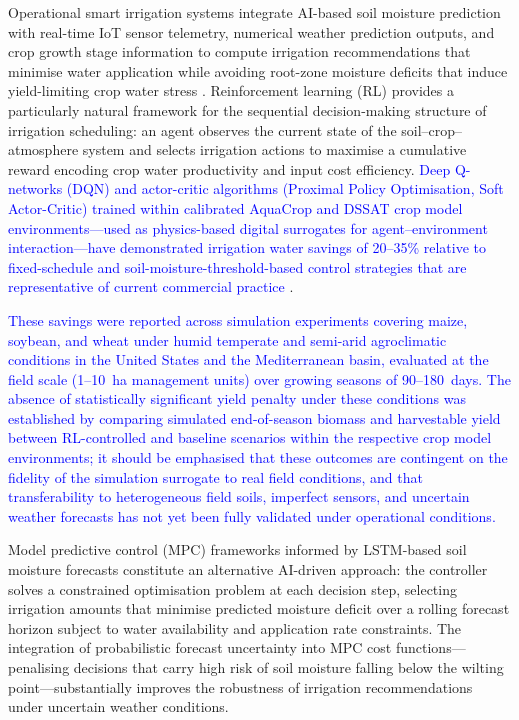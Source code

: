 \documentclass[land,article,submit,pdftex,moreauthors]{Definitions/mdpi}
\numberwithin{equation}{section}
\begin{document}
Operational smart irrigation systems integrate AI-based soil moisture prediction with real-time IoT sensor telemetry, numerical weather prediction outputs, and crop growth stage information to compute irrigation recommendations that minimise water application while avoiding root-zone moisture deficits that induce yield-limiting crop water stress \citep{vij2020iot}. Reinforcement learning (RL) provides a particularly natural framework for the sequential decision-making structure of irrigation scheduling: an agent observes the current state of the soil--crop--atmosphere system and selects irrigation actions to maximise a cumulative reward encoding crop water productivity and input cost efficiency. \textcolor{blue}{Deep Q-networks (DQN) and actor-critic algorithms (Proximal Policy Optimisation, Soft Actor-Critic) trained within calibrated AquaCrop and DSSAT crop model  environments---used as physics-based digital surrogates for agent--environment  interaction---have demonstrated irrigation water savings of 20--35\% relative to  fixed-schedule and soil-moisture-threshold-based control strategies that are  representative of current commercial practice} \citep{saikai2023deep}.

\textcolor{blue}{These savings were reported across simulation experiments covering maize, soybean, and wheat under humid temperate and semi-arid agroclimatic conditions in the United States and the Mediterranean basin, evaluated at the field scale (1--10~ha management units) over growing seasons of 90--180~days. The absence of statistically significant yield penalty under these conditions was established by comparing simulated end-of-season biomass and harvestable yield between RL-controlled and baseline scenarios within the respective crop model environments; it should be emphasised that these outcomes are contingent on the fidelity of the simulation surrogate to real field conditions, and that transferability to heterogeneous field soils, imperfect sensors, and uncertain weather forecasts has not yet been fully validated under operational conditions.}

Model predictive control (MPC) frameworks informed by LSTM-based soil moisture forecasts constitute an alternative AI-driven approach: the controller solves a constrained optimisation problem at each decision step, selecting irrigation amounts that minimise predicted moisture deficit over a rolling forecast horizon subject to water availability and application rate constraints. The integration of probabilistic forecast uncertainty into MPC cost functions---penalising decisions that carry high risk of soil moisture falling below the wilting point---substantially improves the robustness of irrigation recommendations under uncertain weather conditions.
\end{document}
